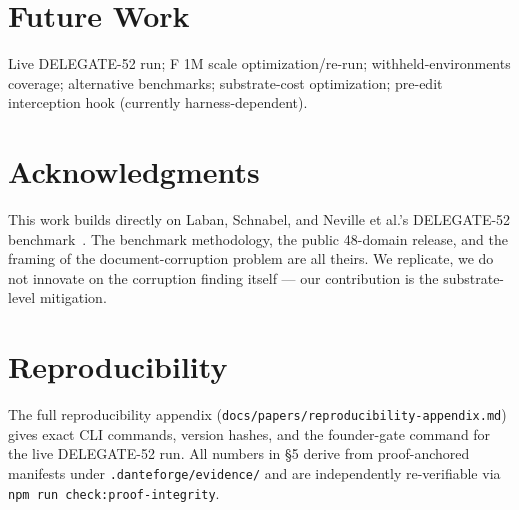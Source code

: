\documentclass[11pt]{article}
\begin{document}
\section{Future Work}

Live DELEGATE-52 run; F 1M scale optimization/re-run; withheld-environments coverage; alternative benchmarks; substrate-cost optimization; pre-edit interception hook (currently harness-dependent).

\section{Acknowledgments}

This work builds directly on Laban, Schnabel, and Neville et al.'s DELEGATE-52 benchmark~\cite{laban2026delegate52}. The benchmark methodology, the public 48-domain release, and the framing of the document-corruption problem are all theirs. We replicate, we do not innovate on the corruption finding itself --- our contribution is the substrate-level mitigation.

\section{Reproducibility}

The full reproducibility appendix (\texttt{docs/papers/reproducibility-appendix.md}) gives exact CLI commands, version hashes, and the founder-gate command for the live DELEGATE-52 run. All numbers in \S5 derive from proof-anchored manifests under \texttt{.danteforge/evidence/} and are independently re-verifiable via \texttt{npm run check:proof-integrity}.



\end{document}
